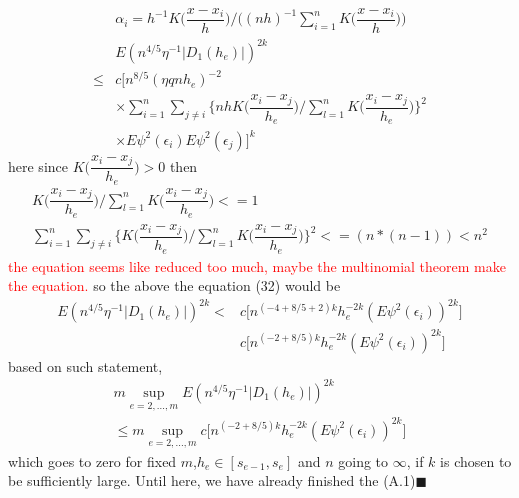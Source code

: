 \documentclass[12pt]{amsart}
\begin{document}
\begin{align}
&\alpha_{i}=h^{-1}K\bigg(\dfrac{x-x_{i}}{h}\bigg)\bigg/ \bigg((nh)^{-1}\sum_{i=1}^{n}K\bigg(\dfrac{x-x_{i}}{h}\bigg)\bigg)
\\
&E(n^{4/5}\eta^{-1} |D_{1}(h_{e})|)^{2k} \nonumber\\
\leq & c\bigg[n^{8/5}(\eta qnh_{e})^{-2} \nonumber\\
&\times \sum_{i=1}^{n}\sum_{j\neq i}^{}\bigg\{nhK\bigg(\dfrac{x_{i}-x_{j}}{h_{e}}\bigg)\bigg/ \sum_{l=1}^{n}K\bigg(\dfrac{x_{i}-x_{j}}{h_{e}}\bigg)\bigg\}^{2}\\
&\times E\psi^{2}(\epsilon_{i})E\psi^{2}(\epsilon_{j})\bigg]^{k} \nonumber
\end{align}
here since $K\bigg(\dfrac{x_{i}-x_{j}}{h_{e}}\bigg)>0$ then 
\begin{align}
K\bigg(\dfrac{x_{i}-x_{j}}{h_{e}}\bigg)\bigg/ \sum_{l=1}^{n}K\bigg(\dfrac{x_{i}-x_{j}}{h_{e}}\bigg)<=1\\
\sum_{i=1}^{n}\sum_{j\neq i}^{}\bigg\{K\bigg(\dfrac{x_{i}-x_{j}}{h_{e}}\bigg)\bigg/ \sum_{l=1}^{n}K\bigg(\dfrac{x_{i}-x_{j}}{h_{e}}\bigg)\bigg\}^{2}<=(n*(n-1))<n^2
\end{align}
\textcolor{red}{the equation seems like reduced too much, maybe the multinomial theorem make the equation.}
so the above the equation (32) would be 
\begin{align}
E(n^{4/5}\eta^{-1} |D_{1}(h_{e})|)^{2k}<&c\bigg[n^{(-4+8/5+2)k}h_{e}^{-2k}(E\psi^{2}(\epsilon_{i}))^{2k}\bigg] \nonumber\\
&c\bigg[n^{(-2+8/5)k}h_{e}^{-2k}(E\psi^{2}(\epsilon_{i}))^{2k}\bigg]
\end{align}
based on such statement, 
\begin{align}
m \sup_{e=2,...,m} E(n^{4/5}\eta^{-1} |D_{1}(h_{e})|)^{2k} \nonumber\\
\leq m \sup_{e=2,...,m}  c\bigg[n^{(-2+8/5)k}h_{e}^{-2k}(E\psi^{2}(\epsilon_{i}))^{2k}\bigg]
\end{align}
which goes to zero for fixed $m$,$h_{e}\in [s_{e-1},s_{e}]$ and $n$ going to $\infty$, if $k$ is chosen to be sufficiently large. 
Until here, we have already finished the (A.1)$\blacksquare$
\end{document}
